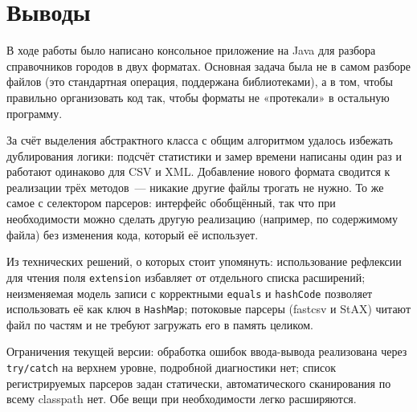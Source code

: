 \documentclass[12pt]{extarticle}
\newcommand{\cmd}[1]{\texttt{#1}}
\begin{document}
\section{Выводы}

В ходе работы было написано консольное приложение на Java для
разбора справочников городов в двух форматах. Основная задача
была не в самом разборе файлов (это стандартная операция,
поддержана библиотеками), а в том, чтобы правильно организовать
код так, чтобы форматы не «протекали» в остальную программу.

За счёт выделения абстрактного класса с общим алгоритмом удалось
избежать дублирования логики: подсчёт статистики и замер времени
написаны один раз и работают одинаково для CSV и XML. Добавление
нового формата сводится к реализации трёх методов~--- никакие
другие файлы трогать не нужно. То же самое с селектором парсеров:
интерфейс обобщённый, так что при необходимости можно сделать
другую реализацию (например, по содержимому файла) без изменения
кода, который её использует.

Из технических решений, о которых стоит упомянуть:
использование рефлексии для чтения поля \cmd{extension}
избавляет от отдельного списка расширений; неизменяемая модель
записи с корректными \cmd{equals} и \cmd{hashCode} позволяет
использовать её как ключ в \cmd{HashMap}; потоковые парсеры
(fastcsv и StAX) читают файл по частям и не требуют загружать
его в память целиком.

Ограничения текущей версии: обработка ошибок ввода-вывода
реализована через \cmd{try/catch} на верхнем уровне, подробной
диагностики нет; список регистрируемых парсеров задан статически,
автоматического сканирования по всему classpath нет. Обе вещи при
необходимости легко расширяются.
\end{document}
